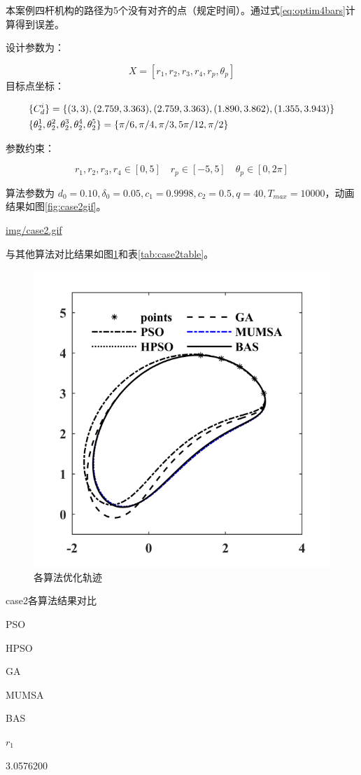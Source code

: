 \documentclass[]{ctexbook}
\theoremstyle{definition}
\theoremstyle{definition}
\theoremstyle{definition}
\theoremstyle{remark}
\begin{document}
本案例四杆机构的路径为5个没有对齐的点（规定时间）。通过式\eqref{eq:optim4bars}计算得到误差。

设计参数为：

\[
X = [r_1,r_2,r_3,r_4,r_p,\theta_p]
\] 目标点坐标：

\begin{align}
&\{C_d^i\} = \{(3,3),(2.759,3.363),(2.759,3.363),(1.890,3.862),(1.355,3.943)\} \notag \\
&\{\theta_2^1,\theta_2^2,\theta_2^3,\theta_2^4,\theta_2^5\}=\{\pi/6,\pi/4,\pi/3,5\pi/12,\pi/2\} \notag \\
\end{align}

参数约束：

\[
r_1,r_2,r_3,r_4\in[0,5]\quad r_p\in[-5,5]\quad \theta_p\in[0,2\pi]
\]

算法参数为
\(d_0 = 0.10,\delta_0=0.05,c_1=0.9998,c_2=0.5,q=40,T_{max}=10000\)，动画结果如图\ref{fig:case2gif}。

\url{img/case2.gif}

与其他算法对比结果如图\ref{fig:case2png}和表\ref{tab:case2table}。

\begin{figure}

{\centering \includegraphics[width=0.5\linewidth]{img/case2png} 

}

\caption{各算法优化轨迹}\label{fig:case2png}
\end{figure}

\label{tab:case2table}case2各算法结果对比

PSO

HPSO

GA

MUMSA

BAS

\(r_1\)

3.0576200
\end{document}
